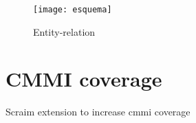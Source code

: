 \begin{landscape}
\begin{figure}[h]
	\begin{center}
		\leavevmode
		\texttt{[image: esquema]}
		\caption{Entity-relation}
		\label{fig:esquema}
	\end{center}
\end{figure}
\end{landscape}

\section{CMMI coverage} \label{sec:cmmicoverage}
Scraim extension to increase cmmi coverage

